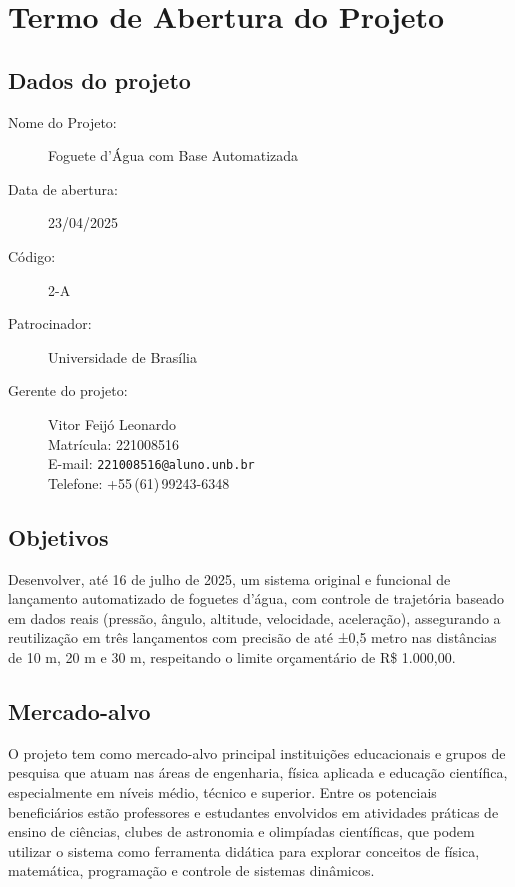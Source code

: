 \chapter{Termo de Abertura do Projeto}


\section{Dados do projeto}
\begin{description}
    \item [Nome do Projeto:] Foguete d’Água com Base Automatizada
    \item [Data de abertura:] 23/04/2025
    \item [Código:] 2-A
    \item [Patrocinador:] Universidade de Brasília
    \item[Gerente do projeto:] Vitor Feijó Leonardo \\
    Matrícula: 221008516 \\
    E-mail: \texttt{221008516@aluno.unb.br} \\
    Telefone: +55\,(61)\,99243-6348
\end{description}

\section{Objetivos}

Desenvolver, até 16 de julho de 2025, um sistema original e funcional de lançamento automatizado de foguetes d'água, com controle de trajetória baseado em dados reais (pressão, ângulo, altitude, velocidade, aceleração), assegurando a reutilização em três lançamentos com precisão de até ±0,5 metro nas distâncias de 10 m, 20 m e 30 m, respeitando o limite orçamentário de R\$ 1.000{,}00.


\section{Mercado-alvo}

O projeto tem como mercado-alvo principal instituições educacionais e grupos de pesquisa que atuam nas áreas de engenharia, física aplicada e educação científica, especialmente em níveis médio, técnico e superior. Entre os potenciais beneficiários estão professores e estudantes envolvidos em atividades práticas de ensino de ciências, clubes de astronomia e olimpíadas científicas, que podem utilizar o sistema como ferramenta didática para explorar conceitos de física, matemática, programação e controle de sistemas dinâmicos.

